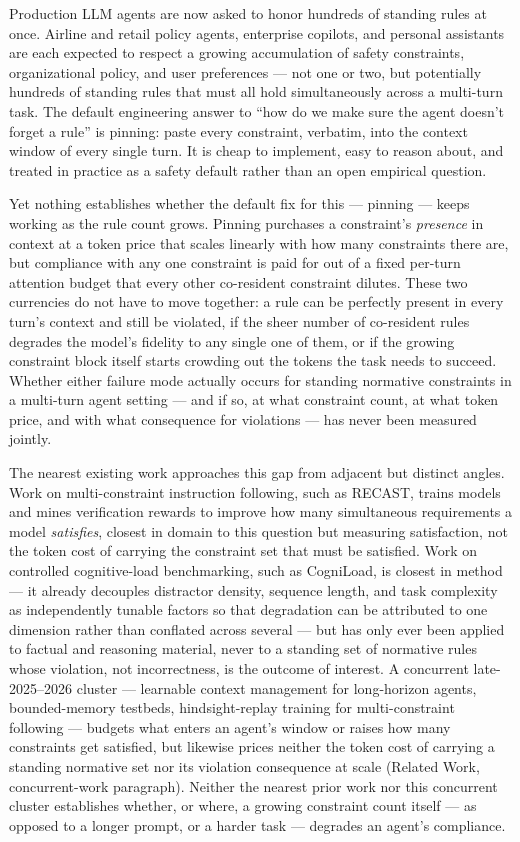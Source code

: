\documentclass[11pt]{article}
\begin{document}
Production LLM agents are now asked to honor hundreds of standing rules at once. Airline and retail policy agents, enterprise copilots, and personal assistants are each expected to respect a growing accumulation of safety constraints, organizational policy, and user preferences --- not one or two, but potentially hundreds of standing rules that must all hold simultaneously across a multi-turn task. The default engineering answer to ``how do we make sure the agent doesn't forget a rule'' is pinning: paste every constraint, verbatim, into the context window of every single turn. It is cheap to implement, easy to reason about, and treated in practice as a safety default rather than an open empirical question.

Yet nothing establishes whether the default fix for this --- pinning --- keeps working as the rule count grows. Pinning purchases a constraint's \emph{presence} in context at a token price that scales linearly with how many constraints there are, but compliance with any one constraint is paid for out of a fixed per-turn attention budget that every other co-resident constraint dilutes. These two currencies do not have to move together: a rule can be perfectly present in every turn's context and still be violated, if the sheer number of co-resident rules degrades the model's fidelity to any single one of them, or if the growing constraint block itself starts crowding out the tokens the task needs to succeed. Whether either failure mode actually occurs for standing normative constraints in a multi-turn agent setting --- and if so, at what constraint count, at what token price, and with what consequence for violations --- has never been measured jointly.

The nearest existing work approaches this gap from adjacent but distinct angles. Work on multi-constraint instruction following, such as RECAST, trains models and mines verification rewards to improve how many simultaneous requirements a model \emph{satisfies}, closest in domain to this question but measuring satisfaction, not the token cost of carrying the constraint set that must be satisfied. Work on controlled cognitive-load benchmarking, such as CogniLoad, is closest in method --- it already decouples distractor density, sequence length, and task complexity as independently tunable factors so that degradation can be attributed to one dimension rather than conflated across several --- but has only ever been applied to factual and reasoning material, never to a standing set of normative rules whose violation, not incorrectness, is the outcome of interest. A concurrent late-2025--2026 cluster --- learnable context management for long-horizon agents, bounded-memory testbeds, hindsight-replay training for multi-constraint following --- budgets what enters an agent's window or raises how many constraints get satisfied, but likewise prices neither the token cost of carrying a standing normative set nor its violation consequence at scale (Related Work, concurrent-work paragraph). Neither the nearest prior work nor this concurrent cluster establishes whether, or where, a growing constraint count itself --- as opposed to a longer prompt, or a harder task --- degrades an agent's compliance.
\end{document}
